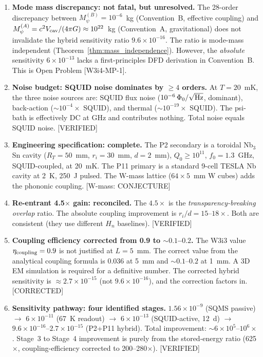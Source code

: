 \documentclass[11pt,twocolumn]{article}
\newcommand{\Mpsi}{M_\psi}
\newcommand{\ee}[1]{\times 10^{#1}}
\newcommand{\Heff}{H_n}
\newcommand{\VcavSym}{V_{\rm cav}}
\theoremstyle{definition}
\theoremstyle{remark}
\begin{document}
\begin{enumerate}

\item \textbf{Mode mass discrepancy: not fatal, but unresolved.}
The 28-order discrepancy between $\Mpsi^{(B)} = 10^{-6}$~kg
(Convention~B, effective coupling) and $\Mpsi^{(A)} = c^2\VcavSym/(4\pi G)
\approx 10^{22}$~kg (Convention~A, gravitational) does not invalidate
the hybrid sensitivity ratio $9.6\ee{-16}$. The ratio is mode-mass
independent (Theorem~\ref{thm:mass_independence}).
However, the \emph{absolute} sensitivity $6\ee{-13}$ lacks a first-principles
DFD derivation in Convention~B. This is Open Problem [W3i4-MP-1].

\item \textbf{Noise budget: SQUID noise dominates by $\geq 4$ orders.}
At $T = 20$~mK, the three noise sources are: SQUID flux noise ($10^{-6}\,\Phi_0/\sqrt{\rm Hz}$,
dominant), back-action ($\sim 10^{-4}\times$ SQUID), and thermal
($\sim 10^{-19}\times$ SQUID). The psi-bath is effectively DC at GHz
and contributes nothing. Total noise equals SQUID noise. [VERIFIED]

\item \textbf{Engineering specification: complete.}
The P2 secondary is a toroidal Nb$_3$Sn cavity ($R_T = 50$~mm, $r_i = 30$~mm,
$d = 2$~mm), $Q_0 \geq 10^{11}$, $f_0 = 1.3$~GHz, SQUID-coupled,
at 20~mK. The P11 primary is a standard 9-cell TESLA Nb cavity at 2~K,
250~J pulsed. The W-mass lattice ($64\times5$~mm W cubes) adds the
phononic coupling. [W-mass: CONJECTURE]

\item \textbf{Re-entrant 4.5$\times$ gain: reconciled.}
The $4.5\times$ is the \emph{transparency-breaking overlap} ratio.
The absolute coupling improvement is $r_i/d = 15$--$18\times$.
Both are consistent (they use different $\Heff$ baselines). [VERIFIED]

\item \textbf{Coupling efficiency corrected from 0.9 to $\sim 0.1$--$0.2$.}
The W3i3 value $\eta_{\rm coupling} = 0.9$ is not justified at $L = 5$~mm.
The correct value from the analytical coupling formula is 0.036 at 5~mm
and $\sim 0.1$--$0.2$ at 1~mm. A 3D EM simulation is required for a
definitive number. The corrected hybrid sensitivity is $\approx 2.7\ee{-15}$
(not $9.6\ee{-16}$), and the correction factors in. [CORRECTED]

\item \textbf{Sensitivity pathway: four identified stages.}
$1.56\ee{-9}$ (SQMS passive) $\to$ $6\ee{-11}$ (67~K readout)
$\to$ $6\ee{-13}$ (SQUID-active, 12~d) $\to$ $9.6\ee{-16}$--$2.7\ee{-15}$
(P2+P11 hybrid). Total improvement: $\sim 6\ee{5}$--$10^6\times$.
Stage~3 to Stage~4 improvement is purely from the stored-energy ratio
(625$\times$, coupling-efficiency corrected to 200--280$\times$). [VERIFIED]


\end{enumerate}
\end{document}
